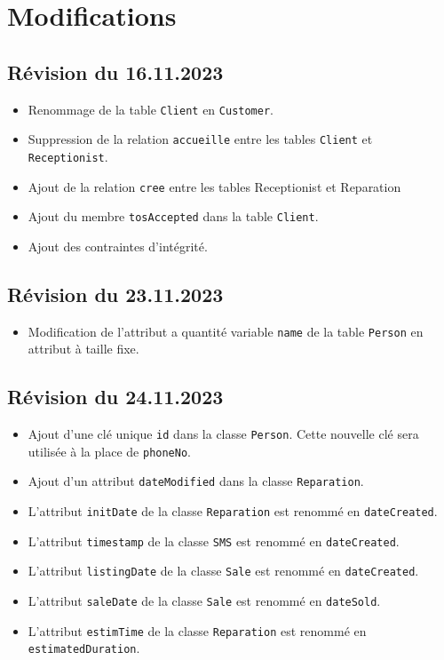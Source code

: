 \documentclass{article}
\begin{document}
\section{Modifications}

\subsection*{Révision du 16.11.2023}

\begin{itemize}
    \item Renommage de la table \texttt{Client} en \texttt{Customer}.
    \item Suppression de la relation \texttt{accueille} entre les tables \texttt{Client} et \texttt{Receptionist}.
    \item Ajout de la relation \texttt{cree} entre les tables {Receptionist} et {Reparation}
    \item Ajout du membre \texttt{tosAccepted} dans la table \texttt{Client}.
    \item Ajout des contraintes d'intégrité.
\end{itemize}

\subsection*{Révision du 23.11.2023}

\begin{itemize}
    \item Modification de l'attribut a quantité variable \texttt{name} de la table \texttt{Person} en attribut à taille fixe.
\end{itemize}

\subsection*{Révision du 24.11.2023}

\begin{itemize}
    \item Ajout d'une clé unique \texttt{id} dans la classe \texttt{Person}. Cette nouvelle clé sera utilisée à la place de \texttt{phoneNo}.
    \item Ajout d'un attribut \texttt{dateModified} dans la classe \texttt{Reparation}.
    \item L'attribut \texttt{initDate} de la classe \texttt{Reparation} est renommé en \texttt{dateCreated}.
    \item L'attribut \texttt{timestamp} de la classe \texttt{SMS} est renommé en \texttt{dateCreated}.
    \item L'attribut \texttt{listingDate} de la classe \texttt{Sale} est renommé en \texttt{dateCreated}.
    \item L'attribut \texttt{saleDate} de la classe \texttt{Sale} est renommé en \texttt{dateSold}.
    \item L'attribut \texttt{estimTime} de la classe \texttt{Reparation} est renommé en \texttt{estimatedDuration}.
\end{itemize}
\end{document}

